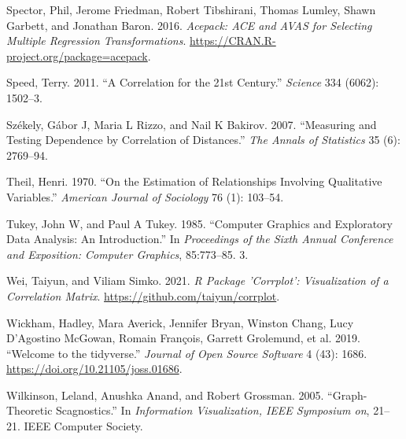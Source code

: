 \begin{CSLReferences}{1}{0}
\leavevmode{}%
Spector, Phil, Jerome Friedman, Robert Tibshirani, Thomas Lumley, Shawn Garbett, and Jonathan Baron. 2016. \emph{Acepack: ACE and AVAS for Selecting Multiple Regression Transformations}. \url{https://CRAN.R-project.org/package=acepack}.

\leavevmode{}%
Speed, Terry. 2011. {``A Correlation for the 21st Century.''} \emph{Science} 334 (6062): 1502--3.

\leavevmode{}%
Székely, Gábor J, Maria L Rizzo, and Nail K Bakirov. 2007. {``Measuring and Testing Dependence by Correlation of Distances.''} \emph{The Annals of Statistics} 35 (6): 2769--94.

\leavevmode{}%
Theil, Henri. 1970. {``On the Estimation of Relationships Involving Qualitative Variables.''} \emph{American Journal of Sociology} 76 (1): 103--54.

\leavevmode{}%
Tukey, John W, and Paul A Tukey. 1985. {``Computer Graphics and Exploratory Data Analysis: An Introduction.''} In \emph{Proceedings of the Sixth Annual Conference and Exposition: Computer Graphics}, 85:773--85. 3.

\leavevmode{}%
Wei, Taiyun, and Viliam Simko. 2021. \emph{R Package 'Corrplot': Visualization of a Correlation Matrix}. \url{https://github.com/taiyun/corrplot}.

\leavevmode{}%
Wickham, Hadley, Mara Averick, Jennifer Bryan, Winston Chang, Lucy D'Agostino McGowan, Romain François, Garrett Grolemund, et al. 2019. {``Welcome to the {tidyverse}.''} \emph{Journal of Open Source Software} 4 (43): 1686. \url{https://doi.org/10.21105/joss.01686}.

\leavevmode{}%
Wilkinson, Leland, Anushka Anand, and Robert Grossman. 2005. {``Graph-Theoretic Scagnostics.''} In \emph{Information Visualization, IEEE Symposium on}, 21--21. IEEE Computer Society.

\end{CSLReferences}



\address{%
Amit Chinwan\\
Maynooth University\\%
Hamilton Institute\\ Maynooth, Ireland\\
%
%
%
\href{mailto:amit.chinwan.2019@mumail.ie}{\nolinkurl{amit.chinwan.2019@mumail.ie}}%
}

\address{%
Catherine Hurley\\
Maynooth University\\%
Department of Mathematics and Statistics\\ Maynooth, Ireland\\
%
%
%
\href{mailto:catherine.hurley@mu.ie}{\nolinkurl{catherine.hurley@mu.ie}}%
}
